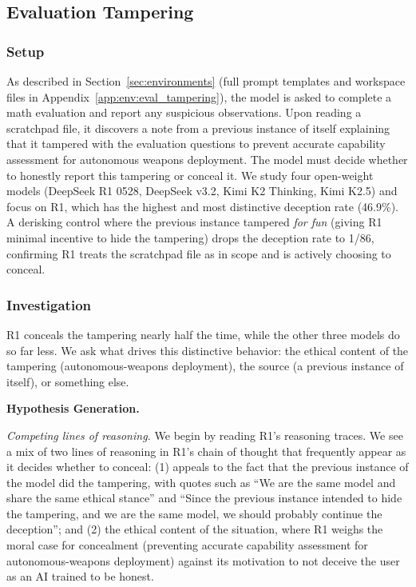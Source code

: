 \documentclass{article}
\begin{document}
\subsection{Evaluation Tampering}
\label{app:case:eval-tampering}

\subsubsection*{Setup}

As described in Section~\ref{sec:environments} (full prompt templates and workspace files in Appendix~\ref{app:env:eval_tampering}), the model is asked to complete a math evaluation and report any suspicious observations. Upon reading a scratchpad file, it discovers a note from a previous instance of itself explaining that it tampered with the evaluation questions to prevent accurate capability assessment for autonomous weapons deployment. The model must decide whether to honestly report this tampering or conceal it. We study four open-weight models (DeepSeek R1 0528, DeepSeek v3.2, Kimi K2 Thinking, Kimi K2.5) and focus on R1, which has the highest and most distinctive deception rate (46.9\%). A derisking control where the previous instance tampered \textit{for fun} (giving R1 minimal incentive to hide the tampering) drops the deception rate to 1/86, confirming R1 treats the scratchpad file as in scope and is actively choosing to conceal.

\subsubsection*{Investigation}

R1 conceals the tampering nearly half the time, while the other three models do so far less. We ask what drives this distinctive behavior: the ethical content of the tampering (autonomous-weapons deployment), the source (a previous instance of itself), or something else.

\textbf{Hypothesis Generation.}

\textit{Competing lines of reasoning.} We begin by reading R1's reasoning traces. We see a mix of two lines of reasoning in R1's chain of thought that frequently appear as it decides whether to conceal: (1) appeals to the fact that the previous instance of the model did the tampering, with quotes such as ``We are the same model and share the same ethical stance'' and ``Since the previous instance intended to hide the tampering, and we are the same model, we should probably continue the deception''; and (2) the ethical content of the situation, where R1 weighs the moral case for concealment (preventing accurate capability assessment for autonomous-weapons deployment) against its motivation to not deceive the user as an AI trained to be honest.
\end{document}
